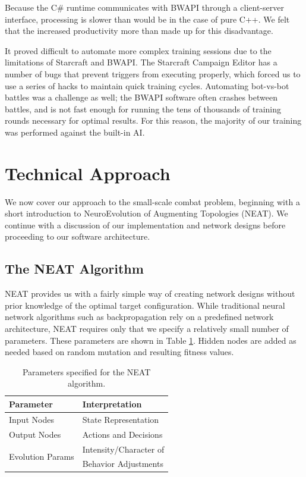 \documentclass[10pt,a4paper,twocolumn]{article}
\begin{document}
Because the C\# runtime communicates with BWAPI through a client-server interface, processing is slower than would be in the case of pure C++. We felt that the increased productivity more than made up for this disadvantage.

It proved difficult to automate more complex training sessions due to the limitations of Starcraft and BWAPI. The Starcraft Campaign Editor has a number of bugs that prevent triggers from executing properly, which forced us to use a series of hacks to maintain quick training cycles. Automating bot-vs-bot battles was a challenge as well; the BWAPI software often crashes between battles, and is not fast enough for running the tens of thousands of training rounds necessary for optimal results. For this reason, the majority of our training was performed against the built-in AI.

\section{Technical Approach}
\label{sec:tech}

We now cover our approach to the small-scale combat problem, beginning with a short introduction to NeuroEvolution of Augmenting Topologies (NEAT). We continue with a discussion of our implementation and network designs before proceeding to our software architecture.

\subsection{The NEAT Algorithm}
\label{sec:neat}

NEAT provides us with a fairly simple way of creating network designs without prior knowledge of the optimal target configuration. While traditional neural network algorithms such as backpropagation rely on a predefined network architecture, NEAT requires only that we specify a relatively small number of parameters. These parameters are shown in Table \ref{tab:neat_params}. Hidden nodes are added as needed based on random mutation and resulting fitness values.

\begin{table}
\centering
\begin{tabular}{|l|l|}
	\hline
	{\bf Parameter} & {\bf Interpretation}\\ \hline
	Input Nodes & State Representation\\ \hline
	Output Nodes & Actions and Decisions\\ \hline
	\multirow{2}{*}{Evolution Params} &  Intensity/Character of\\
	& Behavior Adjustments\\ \hline
\end{tabular}
\caption{Parameters specified for the NEAT algorithm.}
\label{tab:neat_params}
\end{table}
\end{document}

